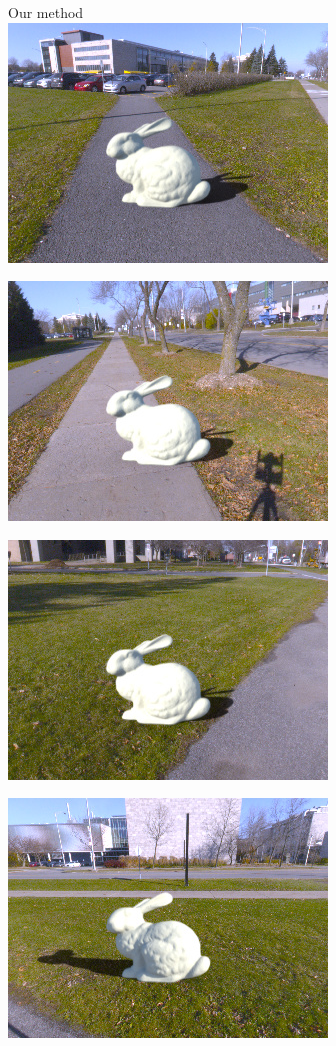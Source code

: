 \begin{minipage}{\linewidth}
\begin{multicols}{4}

Our method\\

\includegraphics[width=\mywidth]{AG8A2749_Panorama_hdr-corrected_003.jpg}

\includegraphics[width=\mywidth]{AG8A2791_Panorama_hdr-corrected_003.jpg}

\includegraphics[width=\mywidth]{AG8A2833_Panorama_hdr-corrected_008.jpg}

\includegraphics[width=\mywidth]{AG8A2833_Panorama_hdr-corrected_005.jpg}


\end{multicols}
\end{minipage}
